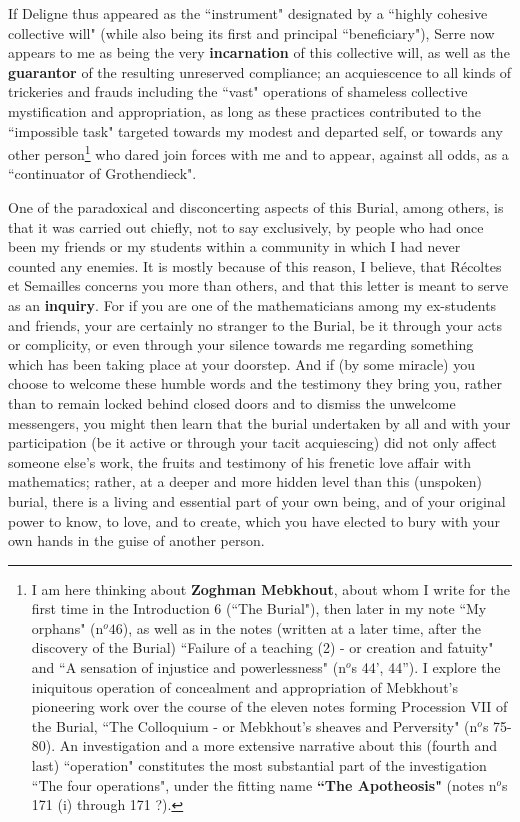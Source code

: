 If Deligne thus appeared as the ``instrument" designated by a ``highly cohesive collective will" (while also being its first and principal ``beneficiary"), Serre now appears to me as being the very \textbf{incarnation} of this collective will, as well as the \textbf{guarantor} of the resulting unreserved compliance; an acquiescence to all kinds of trickeries and frauds including the ``vast" operations of shameless collective mystification and appropriation, as long as these practices contributed to the ``impossible task" targeted towards my modest and departed self, or towards any other person\footnote{I am here thinking about \textbf{Zoghman Mebkhout}, about whom I write for the first time in the Introduction 6 (``The Burial"), then later in my note ``My orphans" (n$^o 46$), as well as in the notes (written at a later time, after the discovery of the Burial) ``Failure of a teaching (2) - or creation and fatuity" and ``A sensation of injustice and powerlessness" (n$^o$s 44', 44''). I explore the iniquitous operation of concealment and appropriation of Mebkhout's pioneering work over the course of the eleven notes forming Procession VII of the Burial, ``The Colloquium - or Mebkhout's sheaves and Perversity" (n$^o$s 75-80). An investigation and a more extensive narrative about this (fourth and last) ``operation" constitutes the most substantial part of the investigation ``The four operations", under the fitting name \textbf{``The Apotheosis"} (notes n$^o$s 171 (i) through 171 ?).} who dared join forces with me and to appear, against all odds, as a ``continuator of Grothendieck".

One of the paradoxical and disconcerting aspects of this Burial, among others, is that it was carried out chiefly, not to say exclusively, by people who had once been my friends or my students within a community in which I had never counted any enemies. It is mostly because of this reason, I believe, that R\'ecoltes et Semailles concerns you more than others, and that this letter is meant to serve as an \textbf{inquiry}. For if you are one of the mathematicians among my ex-students and friends, your are certainly no stranger to the Burial, be it through your acts or complicity, or even through your silence towards me regarding something which has been taking place at your doorstep. And if (by some miracle) you choose to welcome these humble words and the testimony they bring you, rather than to remain locked behind closed doors and to dismiss the unwelcome messengers, you might then learn that the burial undertaken by all and with your participation (be it active or through your tacit acquiescing) did not only affect someone else's work, the fruits and testimony of his frenetic love affair with mathematics; rather, at a deeper and more hidden level than this (unspoken) burial, there is a living and essential part of your own being, and of your original power to know, to love, and to create, which you have elected to bury with your own hands in the guise of another person.

